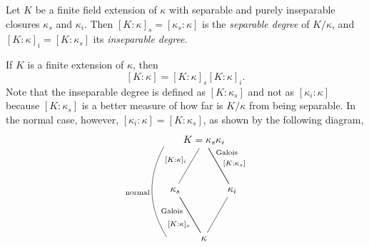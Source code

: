 \begin{defn}
    Let $K$ be a finite field extension of $\kappa$ with separable and purely inseparable closures $\kappa_s$ and $\kappa_i$. Then $[K:\kappa]_s=[\kappa_s:\kappa]$ is the \textsl{separable degree} of $K/\kappa$, and $[K:\kappa]_i=[K:\kappa_s]$ its \textsl{inseparable degree}.
\end{defn}

\begin{rem}\label{rem:sep-and-p.insep-galois}
    If\/ $K$ is a finite extension of\/ $\kappa$, then
    $$
        [K:\kappa]=[K:\kappa]_s[K:\kappa]_i.
    $$
    Note that the inseparable degree is defined as $[K:\kappa_s]$ and not as $[\kappa_i:\kappa]$ because $[K:\kappa_s]$ is a better measure of how far is $K/\kappa$ from being separable. In the normal case, however, $[\kappa_i:\kappa]=[K:\kappa_s]$, as shown by the following diagram,
    $$
        \begin{tikzcd}[column sep=-0.2cm,row sep=huge]
            {}
                &&K=\kappa_s\kappa_i\\
                &\kappa_s
                    \arrow[ru,"{[K:\kappa]_i}",no head]
                &&\kappa_i
                    \arrow[lu,"\text{Galois}"',no head,pos=0.75]
                    \arrow[lu,"{[K:\kappa_s]}"',no head,pos=0.4]\\
            {}
                    \arrow[uu,"\text{normal}",no head,bend left]
                &&\kappa
                    \arrow[lu,"\text{Galois}",no head,pos=0.75]
                    \arrow[ru,no head]
                    \arrow[lu,"{[K:\kappa]_s}",no head,pos=0.4]
        \end{tikzcd}
    $$
\end{rem}

